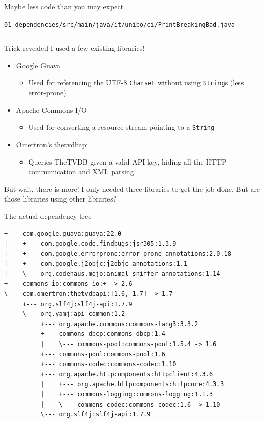 \documentclass[presentation]{beamer}
\newcommand{\codefile}[3]{
	\begin{block}{\texttt{#1}}
		\inputminted[fontsize=#2,linenos=true,breaklines=true]{#3}{workspace/#1}
	\end{block}
}
\newcommand{\java}[2]{\codefile{#1}{#2}{java}}
\begin{document}
\begin{frame}[fragile]{Maybe less code than you may expect}
	\java{01-dependencies/src/main/java/it/unibo/ci/PrintBreakingBad.java}{\tiny}
\end{frame}

\begin{frame}[fragile]{Trick revealed}
  I used a few existing libraries!
  \begin{itemize}
    \item Google Guava
    \begin{itemize}
      \item Used for referencing the UTF-8 \texttt{Charset} without using \texttt{String}s (less error-prone)
    \end{itemize}
    \item Apache Commons I/O
    \begin{itemize}
      \item Used for converting a resource stream pointing to a \texttt{String} 
    \end{itemize}
    \item Omertron's thetvdbapi
    \begin{itemize}
      \item Queries TheTVDB given a valid API key, hiding all the HTTP communication and XML parsing
    \end{itemize}
  \end{itemize}
  \begin{block}{But wait, there is more!}
    I only needed three libraries to get the job done. But are those libraries using other libraries?
  \end{block}
\end{frame}

\begin{frame}[fragile]{The actual dependency tree}
  \begin{block}{}
    \begin{verbatim}
+--- com.google.guava:guava:22.0
|    +--- com.google.code.findbugs:jsr305:1.3.9
|    +--- com.google.errorprone:error_prone_annotations:2.0.18
|    +--- com.google.j2objc:j2objc-annotations:1.1
|    \--- org.codehaus.mojo:animal-sniffer-annotations:1.14
+--- commons-io:commons-io:+ -> 2.6
\--- com.omertron:thetvdbapi:[1.6, 1.7] -> 1.7
     +--- org.slf4j:slf4j-api:1.7.9
     \--- org.yamj:api-common:1.2
          +--- org.apache.commons:commons-lang3:3.3.2
          +--- commons-dbcp:commons-dbcp:1.4
          |    \--- commons-pool:commons-pool:1.5.4 -> 1.6
          +--- commons-pool:commons-pool:1.6
          +--- commons-codec:commons-codec:1.10
          +--- org.apache.httpcomponents:httpclient:4.3.6
          |    +--- org.apache.httpcomponents:httpcore:4.3.3
          |    +--- commons-logging:commons-logging:1.1.3
          |    \--- commons-codec:commons-codec:1.6 -> 1.10
          \--- org.slf4j:slf4j-api:1.7.9
    \end{verbatim}
  \end{block}
\end{frame}
\end{document}

